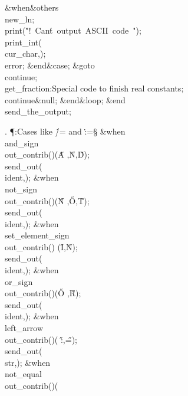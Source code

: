 \4\&{when}\8\&{others}\8\KR\6
\\{new\_ln};\5
\\{print}\?\1(\?\.{"!\ Can\'t\ output\ ASCII\ code\ "}\?\2)\?;\5
\\{print\_int}\?\1(\?\\{cur\_char}\?,\?\2)\?;\5
\\{error};\2\6
\4\2\&{end}\8\&{case};\6
\&{goto}\8\\{continue};\6
\4\BL\\{get\_fraction}\EL\8:Special code to finish real constants\X;\6
\4\BL\\{continue}\EL\8\&{null};\2\6
\&{end}\8\&{loop};\2\6
\&{end}\8\\{send\_the\_output};\par
\fi

. \P\?:Cases like \.{/=} and \.{:=}\X\S\?\6
\4\&{when}\8\\{and\_sign}\KR\8\\{out\_contrib}\?\1(\?\to{}\?\2)\K\1(\?\H{A}%
\?,\?\H{N}\?,\?\H{D}\?\2)\?;\5
\\{send\_out}\?\1(\?\\{ident}\?,\?\2)\?;\6
\4\&{when}\8\\{not\_sign}\KR\8\\{out\_contrib}\?\1(\?\to{}\?\2)\K\1(\?\H{N}%
\?,\?\H{O}\?,\?\H{T}\?\2)\?;\5
\\{send\_out}\?\1(\?\\{ident}\?,\?\2)\?;\6
\4\&{when}\8\\{set\_element\_sign}\KR\8\\{out\_contrib}\?\1(\?\to{}\?\2)\K%
\1(\?\H{I}\?,\?\H{N}\?\2)\?;\5
\\{send\_out}\?\1(\?\\{ident}\?,\?\2)\?;\6
\4\&{when}\8\\{or\_sign}\KR\8\\{out\_contrib}\?\1(\?\to{}\?\2)\K\1(\?\H{O}%
\?,\?\H{R}\?\2)\?;\5
\\{send\_out}\?\1(\?\\{ident}\?,\?\2)\?;\6
\4\&{when}\8\\{left\_arrow}\KR\8\\{out\_contrib}\?\1(\?\to{}\?\2)\K\1(\?%
\H{:}\?,\?\H{=}\?\2)\?;\5
\\{send\_out}\?\1(\?\\{str}\?,\?\2)\?;\6
\4\&{when}\8\\{not\_equal}\KR\8\\{out\_contrib}\?\1(\?\to{}\?\2)\K\1(\?%
